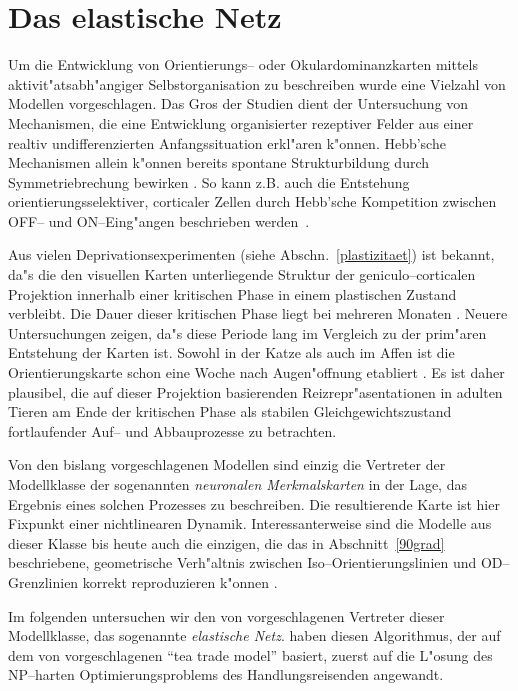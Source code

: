 \section{Das elastische Netz}
\label{modell}
\thispagestyle{plain}

Um die Entwicklung von Orientierungs-- oder Okulardominanzkarten mittels
aktivit"atsabh"angiger Selbstorganisation zu beschreiben wurde eine
Vielzahl von Modellen vorgeschlagen.  Das Gros der Studien dient der
Untersuchung von Mechanismen, die eine Entwicklung organisierter rezeptiver
Felder aus einer realtiv undifferenzierten Anfangssituation erkl"aren
k"onnen. Hebb'sche Mechanismen allein k"onnen bereits spontane
Strukturbildung durch Symmetriebrechung bewirken \cite{linsker:1986}.  So
kann z.B. auch die Entstehung orientierungsselektiver, corticaler Zellen
durch Hebb'sche Kompetition zwischen OFF-- und ON--Eing"angen beschrieben
werden~\cite{miller:1994}.

Aus vielen Deprivationsexperimenten (siehe Abschn.~\ref{plastizitaet}) ist
bekannt, da"s die den visuellen Karten unterliegende Struktur der
geniculo--corticalen Projektion innerhalb einer kritischen Phase in einem
plastischen Zustand verbleibt.  Die Dauer dieser kritischen Phase liegt bei
mehreren Monaten \cite{hubel:1970}.  Neuere Untersuchungen zeigen, da"s
diese Periode lang im Vergleich zu der prim"aren Entstehung der Karten
ist. Sowohl in der Katze als auch im Affen ist die Orientierungskarte schon
eine Woche nach Augen"offnung etabliert
\cite{bonhoeffer:1995,blasdel:1995}.  Es ist daher plausibel, die auf
dieser Projektion basierenden Reizrepr"asentationen in adulten Tieren am
Ende der kritischen Phase als stabilen Gleichgewichtszustand fortlaufender
Auf-- und Abbauprozesse zu betrachten.

Von den bislang vorgeschlagenen Modellen sind einzig die Vertreter der
Modellklasse der sogenannten \emph{neuronalen Merkmalskarten} in der Lage,
das Ergebnis eines solchen Prozesses zu beschreiben. Die resultierende
Karte ist hier Fixpunkt einer nichtlinearen Dynamik.  Interessanterweise
sind die Modelle aus dieser Klasse bis heute auch die einzigen, die das in
Abschnitt~\ref{90grad} beschriebene, geometrische Verh"altnis zwischen
Iso--Orientierungslinien und OD--Grenzlinien korrekt reproduzieren k"onnen
.

Im folgenden untersuchen wir den von 
vorgeschlagenen Vertreter dieser Modellklasse, das sogenannte
\emph{elastische Netz}.  haben diesen Algorithmus,
der auf dem von \protect{} vorgeschlagenen ``tea
trade model'' basiert, zuerst auf die L"osung des
NP--harten Optimierungsproblems des Handlungsreisenden angewandt.


